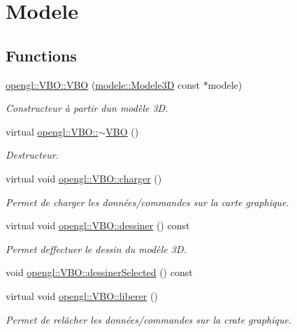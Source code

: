 \hypertarget{group__modele}{}\section{Modele}
\label{group__modele}
\subsection*{Functions}
\begin{DoxyCompactItemize}
\item 
\hyperlink{group__modele_ga6fa9de06cf295f987e2022162f1c0d41}{opengl\+::\+V\+B\+O\+::\+V\+B\+O} (\hyperlink{classmodele_1_1_modele3_d}{modele\+::\+Modele3\+D} const $\ast$modele)
\begin{DoxyCompactList}\small\item\em Constructeur à partir d\textquotesingle{}un modèle 3\+D. \end{DoxyCompactList}\item 
virtual \hyperlink{group__modele_gafcea85cfc425d9c4720a32a53b720783}{opengl\+::\+V\+B\+O\+::$\sim$\+V\+B\+O} ()
\begin{DoxyCompactList}\small\item\em Destructeur. \end{DoxyCompactList}\item 
virtual void \hyperlink{group__modele_gacecd4cf0a91c2b8b34c193f7801d42ea}{opengl\+::\+V\+B\+O\+::charger} ()
\begin{DoxyCompactList}\small\item\em Permet de charger les données/commandes sur la carte graphique. \end{DoxyCompactList}\item 
virtual void \hyperlink{group__modele_ga41350c248ef222b9cbfb850432abbc53}{opengl\+::\+V\+B\+O\+::dessiner} () const 
\begin{DoxyCompactList}\small\item\em Permet d\textquotesingle{}effectuer le dessin du modèle 3\+D. \end{DoxyCompactList}\item 
void \hyperlink{group__modele_ga17f25b54d1a61772cf3a3f88a3ce6274}{opengl\+::\+V\+B\+O\+::dessiner\+Selected} () const 
\item 
virtual void \hyperlink{group__modele_ga6fd3c8634c2da6d9460aa5d118ac47cd}{opengl\+::\+V\+B\+O\+::liberer} ()
\begin{DoxyCompactList}\small\item\em Permet de relâcher les données/commandes sur la crate graphique. \end{DoxyCompactList}\end{DoxyCompactItemize}


